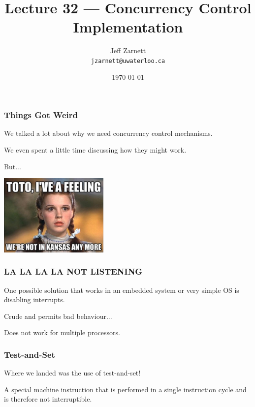 


\title{Lecture 32 --- Concurrency Control Implementation }

\author{Jeff Zarnett \\ \small \texttt{jzarnett@uwaterloo.ca}}
\date{\today}




\begin{frame}
  \titlepage

 \end{frame}

\begin{frame}
\frametitle{Things Got Weird}

We talked a lot about why we need concurrency control mechanisms.

We even spent a little time discussing how they might work.

But...

\begin{center}
	\includegraphics[width=0.4\textwidth]{images/kansas.jpg}
\end{center}

\end{frame}

\begin{frame}
\frametitle{LA LA LA LA NOT LISTENING}

One possible solution that works in an embedded system or very simple OS is disabling interrupts. 

Crude and permits bad behaviour...

Does not work for multiple processors.

\end{frame}

\begin{frame}
\frametitle{Test-and-Set}

Where we landed was the use of test-and-set!

A special machine instruction that is performed in a single instruction cycle and is therefore not interruptible.

\end{frame}

